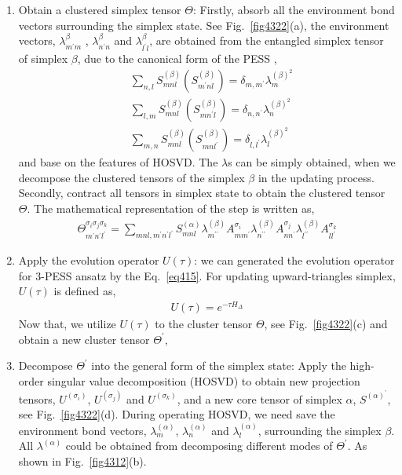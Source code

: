 \begin{enumerate}
	\item Obtain a clustered simplex tensor $\Theta$: Firstly, absorb all the environment bond vectors surrounding the simplex state. See Fig.~\ref{fig4322}(a),  the environment vectors, $\lambda^{\beta}_{m^{\prime}m}$ , $\lambda^{\beta}_{n^{\prime}n}$ and $\lambda^{\beta}_{l^{\prime}l}$, are obtained from the entangled simplex tensor of simplex $\beta$, due to the canonical form of the PESS \cite{},
		\begin{align}
			&\sum_{n,l}{S^{(\beta)}_{mnl}\left( S^{(\beta)}_{m^{\prime}nl}\right)} = \delta_{m,m^{\prime}} \lambda^{(\beta)^2}_{m} \\
			&\sum_{l,m}{S^{(\beta)}_{mnl}\left( S^{(\beta)}_{mn^{\prime}l}\right)} = \delta_{n,n^{\prime}} \lambda^{(\beta)^2}_{n} \\
			&\sum_{m,n}{S^{(\beta)}_{mnl}\left( S^{(\beta)}_{mnl^{\prime}}\right)} = \delta_{l,l^{\prime}} \lambda^{(\beta)^2}_{l}
		\end{align}
		and base on the features of HOSVD. The $\lambda$s can be simply obtained, when we decompose the clustered tensors of the simplex $\beta$ in the updating process. Secondly, contract all tensors in simplex state to obtain the clustered tensor $\Theta$. The mathematical representation of the step is written as,  
		\begin{align}
			\Theta_{m^{\prime} n^{\prime} l^{\prime}}^{\sigma_i \sigma_j \sigma_k} = \sum_{mnl,m^{\prime}n^{\prime}l^{\prime}}{S^{(\alpha)}_{mnl} \lambda^{(\beta)}_{m^{\prime \prime}} A^{\sigma_i}_{mm^{\prime}} \lambda^{(\beta)}_{n^{\prime \prime}} A^{\sigma_j}_{nn^{\prime}} \lambda^{(\beta)}_{l^{\prime \prime}} A^{\sigma_k}_{ll^{\prime}}}
		\end{align}
	\item Apply the evolution operator $U(\tau)$: we can generated the evolution operator for 3-PESS ansatz by the Eq.~\ref{eq415}. For updating upward-triangles simplex, $U(\tau)$ is defined as, 
		\begin{align}
			U(\tau) = e^{-\tau H_{\Delta}}
		\end{align}
		Now that, we utilize $U(\tau)$ to the cluster tensor $\Theta$, see Fig.~\ref{fig4322}(c) and obtain a new cluster tensor $\Theta^{\prime}$, 
	\item Decompose $\Theta^{\prime}$ into the general form of the simplex state: Apply the high-order singular value decomposition (HOSVD) to obtain new projection tensors, $U^{(\sigma_i)}$, $U^{(\sigma_j)}$ and $U^{(\sigma_k)}$, and a new core tensor of simplex $\alpha$, $S^{(\alpha)^{\prime}}$, see Fig.~\ref{fig4322}(d). During operating HOSVD, we need save the environment bond vectors, $\lambda^{(\alpha)}_{m}$, $\lambda^{(\alpha)}_{n}$ and $\lambda^{(\alpha)}_{l}$, surrounding the simplex $\beta$. All $\lambda^{(\alpha)}$ could be obtained from decomposing different modes of $\Theta^{\prime}$. As shown in Fig.~\ref{fig4312}(b).

\end{enumerate}
